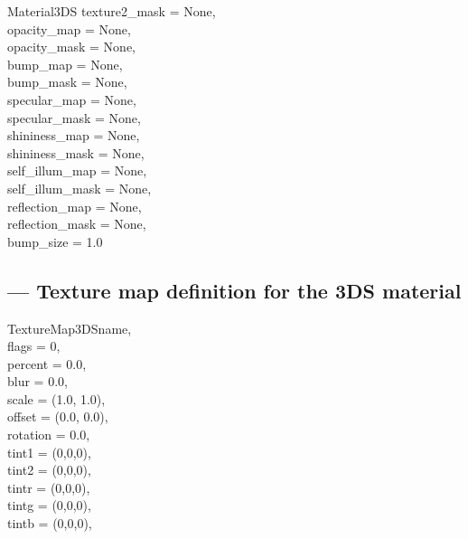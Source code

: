\begin{classdesc}{Material3DS}
{                              texture2_mask = None,\\
                              opacity_map = None,\\
                              opacity_mask = None,\\
                              bump_map = None,\\
                              bump_mask = None,\\
                              specular_map = None,\\
                              specular_mask = None,\\
                              shininess_map = None,\\
                              shininess_mask = None,\\
                              self_illum_map = None,\\
                              self_illum_mask = None,\\
                              reflection_map = None,\\
                              reflection_mask = None,\\
                              bump_size = 1.0
	                      }
\end{classdesc}


\subsection{ --- Texture map definition for the 3DS material}

\begin{classdesc}{TextureMap3DS}{name,\\
                                 flags = 0,\\
                                 percent = 0.0,\\
                                 blur = 0.0,\\
                                 scale = (1.0, 1.0),\\
                                 offset = (0.0, 0.0),\\
                                 rotation = 0.0,\\
                                 tint1 = (0,0,0),\\
                                 tint2 = (0,0,0),\\
                                 tintr = (0,0,0),\\
                                 tintg = (0,0,0),\\
                                 tintb = (0,0,0),\\
                                }
\end{classdesc}
